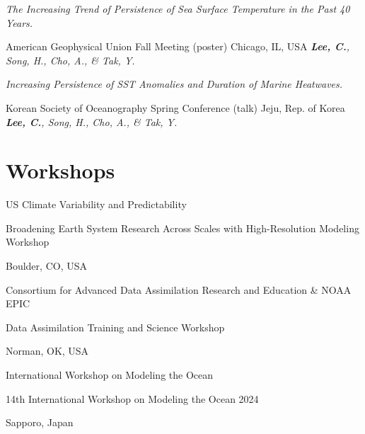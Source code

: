\documentclass[11pt,usletter,sans]{moderncv}
\begin{document}
\vspace{0.8em}

        {\parbox[t]{0.8\textwidth}{\textit{The Increasing Trend of Persistence of Sea Surface Temperature in the Past 40 Years.}}}
        {American Geophysical Union Fall Meeting (poster)}   %
        {Chicago, IL, USA}            %
        {}
        {}
        {\emph{\textbf{Lee, C.}, Song, H., Cho, A., \& Tak, Y.}}
        
\vspace{0.8em}

        {\parbox[t]{0.8\textwidth}{\textit{Increasing Persistence of SST Anomalies and Duration of Marine Heatwaves.}}}
        {Korean Society of Oceanography Spring Conference (talk)} %
        {Jeju, Rep. of Korea}        %
        {}
        {}
        {\emph{\textbf{Lee, C.}, Song, H., Cho, A., \& Tak, Y.}}

\section{Workshops}

        {US Climate Variability and Predictability}
        {\parbox[t]{0.7\textwidth}{Broadening Earth System Research Across Scales with High-Resolution Modeling Workshop}}
        {Boulder, CO, USA}
        {}
        {}

\vspace{0.5em}

        {Consortium for Advanced Data Assimilation Research and Education \& NOAA EPIC}
        {\parbox[t]{0.7\textwidth}{Data Assimilation Training and Science Workshop}}
        {Norman, OK, USA}        %
        {}                           %
        {}                           %

\vspace{0.5em}

        {International Workshop on Modeling the Ocean}
        {\parbox[t]{0.7\textwidth}{14th International Workshop on Modeling the Ocean 2024}}
        {Sapporo, Japan}        %
        {}                           %
        {}                           %
\end{document}
